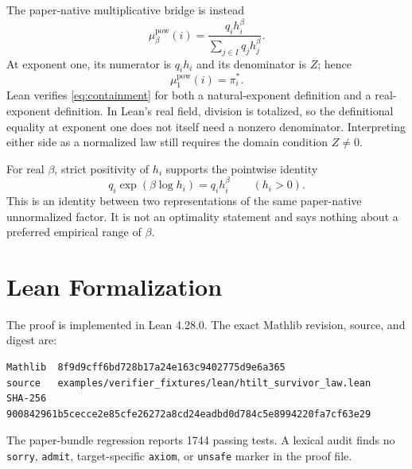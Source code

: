 \documentclass[10pt]{article}
\newcommand{\pistar}{\pi^{*}}
\begin{document}
The paper-native multiplicative bridge is instead
\begin{equation}\label{eq:multiplicative}
  \mu^{\mathrm{pow}}_\beta(i)
  =
  \frac{q_i h_i^\beta}{\sum_{j\in I}q_jh_j^\beta}.
\end{equation}
At exponent one, its numerator is \(q_i h_i\) and its denominator is \(Z\);
hence
\begin{equation}\label{eq:containment}
  \mu^{\mathrm{pow}}_1(i)=\pistar_i.
\end{equation}
Lean verifies \eqref{eq:containment} for both a natural-exponent definition and
a real-exponent definition. In Lean's real field, division is totalized, so
the definitional equality at exponent one does not itself need a nonzero
denominator. Interpreting either side as a normalized law still requires the
domain condition \(Z\ne0\).

For real \(\beta\), strict positivity of \(h_i\) supports the pointwise identity
\begin{equation}\label{eq:logexp}
  q_i\exp(\beta\log h_i)=q_i h_i^\beta
  \qquad(h_i>0).
\end{equation}
This is an identity between two representations of the same paper-native
unnormalized factor. It is not an optimality statement and says nothing about a
preferred empirical range of \(\beta\).

\section{Lean Formalization}

The proof is implemented in Lean 4.28.0. The exact Mathlib revision, source,
and digest are:
\begin{Verbatim}[fontsize=\scriptsize]
Mathlib  8f9d9cff6bd728b17a24e163c9402775d9e6a365
source   examples/verifier_fixtures/lean/htilt_survivor_law.lean
SHA-256  900842961b5cecce2e85cfe26272a8cd24eadbd0d784c5e8994220fa7cf63e29
\end{Verbatim}
The paper-bundle regression reports 1744 passing tests. A lexical audit finds no
\texttt{sorry}, \texttt{admit}, target-specific \texttt{axiom}, or
\texttt{unsafe} marker in the proof file.
\end{document}
